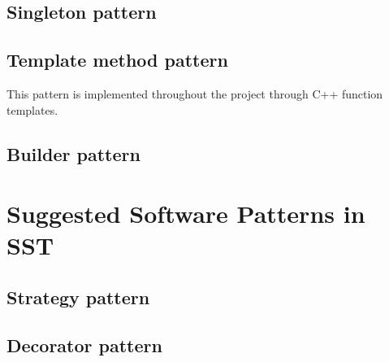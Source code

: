 \documentclass[titlepage]{article}
\begin{document}
\subsection{Singleton pattern}

\subsection{Template method pattern}
This pattern is implemented throughout the project through C++ function templates.

\subsection{Builder pattern}

\section{Suggested Software Patterns in SST}

\subsection{Strategy pattern}

\subsection{Decorator pattern}




\end{document}
